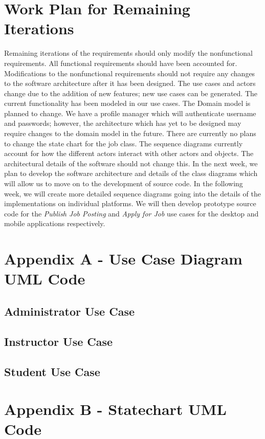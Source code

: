 \documentclass[12pt,openany]{report}
\begin{document}
\chapter{Work Plan for Remaining Iterations}
Remaining iterations of the requirements should only modify the nonfunctional
requirements. All functional requirements should have been accounted for. Modifications to
the nonfunctional requirements should not require any changes to the software architecture
after it has been designed.
The use cases and actors change due to the addition of new features; new use cases can
be generated. The current functionality has been modeled in our use cases.
The Domain model is planned to change. We have a profile manager which will
authenticate username and passwords; however, the architecture which has yet to be designed
may require changes to the domain model in the future.
There are currently no plans to change the state chart for the job class.
The sequence diagrams currently account for how the different actors interact with
other actors and objects. The architectural details of the software should not change this.
In the next week, we plan to develop the software architecture and details of the class
diagrams which will allow us to move on to the development of source code.
In the following week, we will create more detailed sequence diagrams going into the
details of the implementations on individual platforms. We will then develop prototype source
code for the \textit{Publish Job Posting} and \textit{Apply for Job} use cases for the desktop and mobile
applications respectively.
\chapter*{Appendix A - Use Case Diagram UML Code}
\label{appA}
\section*{Administrator Use Case}

\section*{Instructor Use Case}

\section*{Student Use Case}

\chapter*{Appendix B - Statechart UML Code}
\label{appB}

\end{document}
